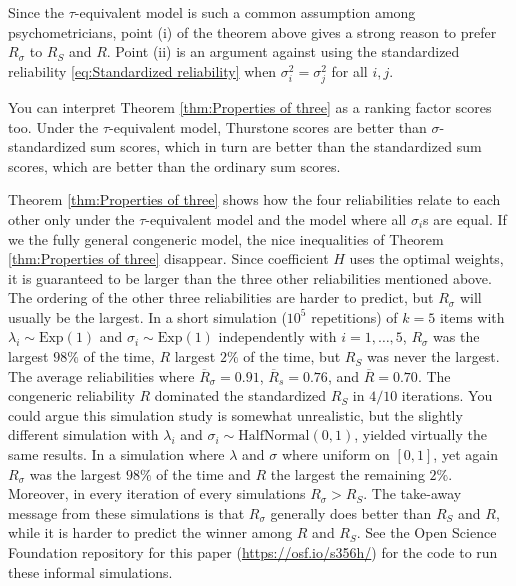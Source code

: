\documentclass[twoside]{article}
\begin{document}
Since the $\tau$-equivalent model is such a common assumption among psychometricians, point (i) of the theorem above gives a strong reason to prefer $ R_{\sigma}$ to $R_S$ and $R$. Point (ii) is an argument against using the standardized reliability \eqref{eq:Standardized reliability} when $\sigma_{i}^{2}=\sigma_j^{2}$ for all $i,j$.

You can interpret Theorem \ref{thm:Properties of three} as a ranking factor scores too. Under the $\tau$-equivalent model, Thurstone scores are better than $\sigma$-standardized sum scores, which in turn are better than the standardized sum scores, which are
better than the ordinary sum scores.

Theorem \ref{thm:Properties of three} shows how the four reliabilities relate to each other only under the $\tau$-equivalent model and the model where all $\sigma_i$s are equal. If we the fully general congeneric model, the nice inequalities of Theorem \ref{thm:Properties of three} disappear. Since coefficient $H$ uses the optimal weights, it is guaranteed to be larger than the three other reliabilities mentioned above. The ordering of the other three reliabilities are harder to predict, but $ R_{\sigma}$ will usually be the largest. In a short
simulation ($10^{5}$ repetitions) of $k=5$ items with $\lambda_{i}\sim \textrm{Exp}(1)$
and $\sigma_{i}\sim \textrm{Exp}(1)$ independently with $i=1,\ldots,5$, $ R_{\sigma}$
was the largest $98\%$ of the time, $ R$ largest $2\%$
of the time, but $ R_{S}$ was never the largest. The average reliabilities where $\overline{ R}_\sigma = 0.91$, $\overline{ R}_s= 0.76$, and $\overline{ R} = 0.70$.
The congeneric reliability $ R$ dominated the standardized $ R_{S}$ in $4/10$ iterations. You could argue this simulation study
is somewhat unrealistic, but the slightly different simulation with $\lambda_{i}$ and $\sigma_{i}\sim \textrm{HalfNormal}(0,1)$, yielded virtually the same results. In a simulation where $\lambda$ and $\sigma$ where uniform on $[0,1]$, yet again $ R_{\sigma}$
was the largest $98\%$ of the time and $ R$ the largest the remaining $2\%$. Moreover, in every iteration of every simulations $ R_\sigma >  R_S$. The take-away message from these simulations is that $ R_\sigma$ generally does better than $ R_{S}$ and
$ R$, while it is harder to predict the winner among $ R$
and $ R_{S}$. See the Open Science Foundation repository for this paper (\url{https://osf.io/s356h/}) for the code to run these informal simulations.
\end{document}
